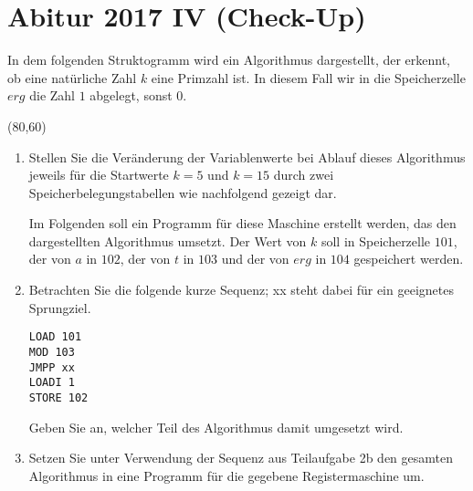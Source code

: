 \documentclass{lehramt-informatik-aufgabe}
\begin{document}

\section{Abitur 2017 IV (Check-Up)}

In dem folgenden Struktogramm wird ein Algorithmus dargestellt, der
erkennt, ob eine natürliche Zahl $k$ eine Primzahl ist. In diesem Fall
wir in die Speicherzelle $erg$ die Zahl $1$ abgelegt, sonst $0$.

\begin{center}
\begin{struktogramm}(80,60)
\change


    \change
    \ifend
  \untilend

  \change
  \ifend
\ifend
\end{struktogramm}
\end{center}

\begin{enumerate}


\item Stellen Sie die Veränderung der Variablenwerte bei Ablauf dieses
Algorithmus jeweils für die Startwerte $k = 5$ und $k = 15$ durch zwei
Speicherbelegungstabellen wie nachfolgend gezeigt dar.

Im Folgenden soll ein Programm für diese Maschine erstellt werden, das
den dargestellten Algorithmus umsetzt. Der Wert von $k$ soll in
Speicherzelle $101$, der von $a$ in $102$, der von $t$ in $103$ und der
von $erg$ in $104$ gespeichert werden.


\item Betrachten Sie die folgende kurze Sequenz; xx steht dabei für ein
geeignetes Sprungziel.

\begin{verbatim}
LOAD 101
MOD 103
JMPP xx
LOADI 1
STORE 102
\end{verbatim}

Geben Sie an, welcher Teil des Algorithmus damit umgesetzt wird.


\item Setzen Sie unter Verwendung der Sequenz aus Teilaufgabe 2b den
gesamten Algorithmus in eine Programm für die gegebene Registermaschine
um.
\end{enumerate}
\end{document}
